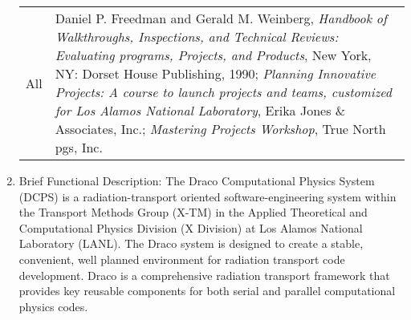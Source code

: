 \begin{enumerate}
\begin{center}
\begin{tabular}{l|p{3in}}
All         & Daniel P. Freedman and Gerald M. Weinberg, {\em Handbook
              of Walkthroughs, Inspections, and Technical Reviews:
              Evaluating programs, Projects, and Products}, New
              York, NY: Dorset House Publishing, 1990;
              {\em Planning Innovative Projects: A course to launch
              projects and teams, customized for Los Alamos National
              Laboratory}, Erika Jones \& Associates, Inc.; 
              {\em Mastering Projects Workshop}, True North pgs, Inc.
\end{tabular}
\end{center}
\item Brief Functional Description: The Draco Computational Physics
System (DCPS) is a radiation-transport oriented software-engineering
system within the Transport Methods Group (X-TM) in the Applied
Theoretical and Computational Physics Division (X Division) at Los
Alamos National Laboratory (LANL). The Draco system is designed to
create a stable, convenient, well planned environment for radiation
transport code development. Draco is a comprehensive radiation
transport framework that provides key reusable components for both
serial and parallel computational physics codes.
\end{enumerate}


